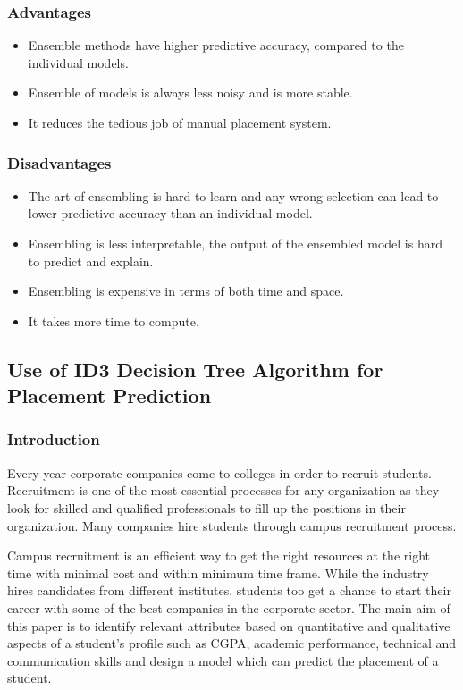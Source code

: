\documentclass[12pt]{article}
\begin{document}
\subsubsection{Advantages}
\begin{itemize}
\item Ensemble methods have higher predictive accuracy, compared to the individual models.
\item Ensemble of models is always less noisy and is more stable. 
\item It reduces the tedious job of manual placement system. 
\end{itemize}
\vspace{10px}
\par \subsubsection{Disadvantages}
\begin{itemize}
\item The art of ensembling is hard to learn and any wrong selection can lead to lower predictive accuracy than an individual model.
\item Ensembling is less interpretable, the output of the ensembled model is hard to predict and explain.
\item Ensembling is expensive in terms of both time and space.
\item It takes more time to compute.
\end{itemize}
\vspace{10px}
\newpage

\subsection{Use of ID3 Decision Tree Algorithm for Placement Prediction}
\vspace*{10px}

\subsubsection{Introduction}
Every year corporate companies come to 
colleges in order to recruit students. Recruitment is one of the 
most essential processes for any organization as they look for 
skilled and qualified professionals to fill up the positions in 
their organization. Many companies hire students through 
campus recruitment process. 

Campus recruitment is an 
efficient way to get the right resources at the right time with 
minimal cost and within minimum time frame. While the 
industry hires candidates from different institutes, students 
too get a chance to start their career with some of the best 
companies in the corporate sector.
The main aim of this paper is to identify relevant attributes based on quantitative and 
qualitative aspects of a student's profile such as CGPA, 
academic performance, technical and communication skills 
and design a model which can predict the placement of a 
student. 
\end{document}
